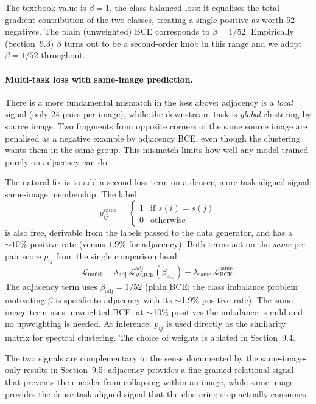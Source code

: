 \documentclass[12pt, a4paper]{article}
\begin{document}
The textbook value is $\beta = 1$, the class-balanced loss: it equalises the
total gradient contribution of the two classes, treating a single positive as
worth 52 negatives. The plain (unweighted) BCE corresponds to $\beta = 1/52$.
Empirically (Section~9.3) $\beta$ turns out to be a second-order knob in this
range and we adopt $\beta = 1/52$ throughout.

\paragraph{Multi-task loss with same-image prediction.}
There is a more fundamental mismatch in the loss above: adjacency is a
\emph{local} signal (only $24$ pairs per image), while the downstream task is
\emph{global} clustering by source image. Two fragments from opposite corners
of the same source image are penalised as a negative example by adjacency BCE,
even though the clustering wants them in the same group. This mismatch limits
how well any model trained purely on adjacency can do.

The natural fix is to add a second loss term on a denser, more task-aligned
signal: same-image membership. The label
\[
y^{\text{same}}_{ij} = \begin{cases} 1 & \text{if } s(i) = s(j) \\ 0 & \text{otherwise} \end{cases}
\]
is also free, derivable from the labels passed to the data generator, and has
a $\sim 10\%$ positive rate (versus $1.9\%$ for adjacency). Both terms act on
the \emph{same} per-pair score $p_{ij}$ from the single comparison head:
\begin{equation}
\mathcal{L}_{\text{multi}} =
    \lambda_{\text{adj}}\,\mathcal{L}_{\text{WBCE}}^{\text{adj}}(\beta_{\text{adj}})
  + \lambda_{\text{same}}\,\mathcal{L}_{\text{BCE}}^{\text{same}}.
\label{eq:multi}
\end{equation}
The adjacency term uses $\beta_{\text{adj}} = 1/52$ (plain BCE; the class
imbalance problem motivating $\beta$ is specific to adjacency with its
$\sim$1.9\% positive rate). The same-image term uses unweighted BCE:
at $\sim$10\% positives the imbalance is mild and no upweighting is needed.
At inference, $p_{ij}$ is used directly as the similarity matrix for spectral
clustering. The choice of weights is ablated in Section~9.4.

The two signals are complementary in the sense documented by the
same-image-only results in Section~9.5: adjacency provides a fine-grained
relational signal that prevents the encoder from collapsing within an image,
while same-image provides the dense task-aligned signal that the clustering
step actually consumes.
\end{document}
